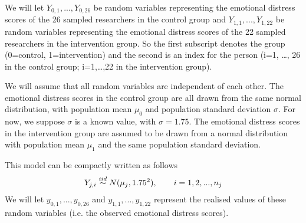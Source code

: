\documentclass[letterpaper,10pt,english]{jupyterBook}
\begin{document}
\sphinxAtStartPar
{}  We will let \(Y_{0,1}, ...,Y_{0,26}\) be random variables representing the emotional distress scores of the 26 sampled researchers in the control group and \(Y_{1,1}, ...,Y_{1,22}\) be random variables representing the emotional distress scores of the 22 sampled researchers in the intervention group. So the first subscript denotes the group (0=control, 1=intervention) and the second is an index for the person (i=1, …, 26 in the control group; i=1,…,22 in the intervention group).

\sphinxAtStartPar
We will assume that all random variables are independent of each other. The emotional distress scores in the control group are all drawn from the same normal distribution, with population mean \(\mu_0\) and population standard deviation  \(\sigma\). For now, we suppose \(\sigma\) is a known value, with \(\sigma = 1.75\). The emotional distress scores in the intervention group are assumed to be drawn from a normal distribution with population mean \(\mu_1\) and the same population standard deviation.

\sphinxAtStartPar
This model can be compactly written as follows
\begin{equation*}
\begin{split} 
Y_{j,i} \overset{\small{iid}}{\sim} N(\mu_j, 1.75^2), \qquad i=1,2,...,n_j
\end{split}
\end{equation*}
\sphinxAtStartPar
{} We will let \(y_{0,1}, ...,y_{0,26}\) and \(y_{1,1}, ...,y_{1,22}\) represent the realised values of these random variables (i.e. the observed emotional distress scores).
\end{document}
